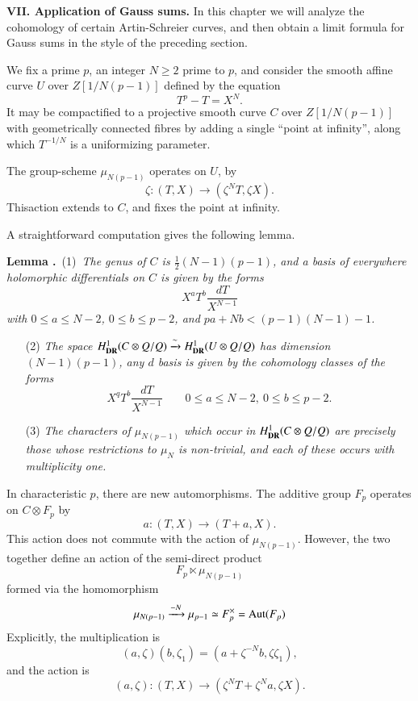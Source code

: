 \bigskip
\noindent
{\bf VII. Application of Gauss sums.} In this chapter we will analyze the cohomology of certain Artin-Schreier curves, and then obtain a limit formula for Gauss sums in the style of the preceding section.

We fix a prime $p$, an integer $N\geq 2$ prime to $p$, and consider the smooth affine curve $U$ over $Z[1/N(p-1)]$ defined by the equation
$$
T^{p}-T=X^{N}.
$$
It may be compactified to a projective smooth curve $C$ over $Z[1/N(p-1)]$ with geometrically connected fibres by adding a single ``point at infinity'', along which $T^{-1/N}$ is a uniformizing parameter.

The group-scheme $\mu_{N(p-1)}$ operates on $U$, by
$$
\zeta :(T,X)\to (\zeta^{N}T,\zeta X).
$$
This\pageoriginale action extends to $C$, and fixes the point at infinity.

A straightforward computation gives the following lemma.

\medskip
\noindent
{\bf Lemma .\label{art6-lem7.1}}~(1)~{\em The genus of $C$ is $\frac{1}{2}(N-1)(p-1)$, and a basis of everywhere holomorphic differentials on $C$ is given by the forms}
$$
X^{a}T^{b}\frac{dT}{X^{N-1}}
$$
{\em with $0\leq a\leq N-2$, $0\leq b\leq p-2$, and $pa+Nb<(p-1)(N-1)-1$.}
\begin{itemize}
\item[(2)] {\em The space $H^{1}_{\mathbf{DR}}(C\otimes Q/Q)\xrightarrow{\sim} H^{1}_{\mathbf{DR}}(U\otimes Q/Q)$ has dimension $(N-1)(p-1)$, any $d$ basis is given by the cohomology classes of the forms}
$$
X^{q}T^{b}\frac{dT}{X^{N-1}}\qquad 0\leq a\leq N-2, \ 0\leq b\leq p-2.
$$

\item[(3)] {\em The characters of $\mu_{N(p-1)}$ which occur in $H^{1}_{\mathbf{DR}}(C\otimes Q/Q)$ are precisely those whose restrictions to $\mu_{N}$ is non-trivial, and each of these occurs with multiplicity one.}
\end{itemize}

In characteristic $p$, there are new automorphisms. The additive group $F_{p}$ operates on $C\otimes F_{p}$ by
$$
a:(T,X)\to (T+a,X).
$$
This action does not commute with the action of $\mu_{N(p-1)}$. However, the two together define an action of the semi-direct product
$$
F_{p} \ltimes \mu_{N(p-1)}
$$
formed via the homomorphism
$$
\mu_{N(p-1)}\xrightarrow{-N} \mu_{p-1}\simeq F^{\times}_{p}=\operatorname{Aut} (F_{p})
$$
Explicitly, the multiplication is
$$
(a,\zeta)(b,\zeta_{1})=(a+\zeta^{-N}b,\zeta\zeta_{1}),
$$
and the action is
$$
(a,\zeta):(T,X)\to (\zeta^{N}T+\zeta^{N}a,\zeta X).
$$


